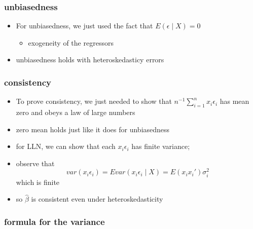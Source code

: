 \documentclass[11pt]{article}
\begin{document}
\subsubsection{unbiasedness}
\label{sec-1-1-2}

\begin{itemize}
\item For unbiasedness, we just used the fact that $E(\epsilon \mid
        X) = 0$
\begin{itemize}
\item exogeneity of the regressors
\end{itemize}
\item unbiasedness holds with heteroskedasticy errors
\end{itemize}
\subsubsection{consistency}
\label{sec-1-1-3}

\begin{itemize}
\item To prove consistency, we just needed to show that
        $n^{-1}\sum_{i=1}^n x_i \epsilon_i$ has mean zero and obeys a
        law of large numbers
\item zero mean holds just like it does for unbiasedness
\item for LLN, we can show that each $x_i \epsilon_i$ has finite
        variance;
\item observe that
        \[var(x_i \epsilon_i) = E var(x_i \epsilon_i \mid X) = E(x_i
        x_i') \sigma_i^2\]
        which is finite
\item so $\hat\beta$ is consistent even under heteroskedasticity
\end{itemize}
\subsubsection{formula for the variance}
\label{sec-1-1-4}
\end{document}
